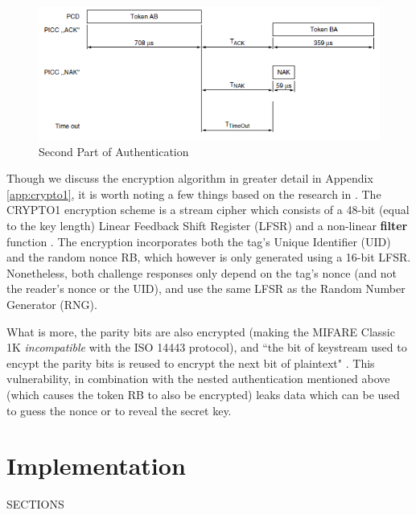 \documentclass[fleqn,10pt]{SelfArx} %
\begin{document}
\begin{figure}[h]
  \includegraphics[width=\linewidth]{img/auth2.png}
  \caption{Second Part of Authentication \cite{classic1k}}
  \label{fig:auth2}
\end{figure}

Though we discuss the encryption algorithm in greater detail in Appendix \ref{app:crypto1}, it is worth noting a few things based on the research in \cite{crypto1, classicvulnerabilities}. The CRYPTO1 encryption scheme is a stream cipher which consists of a 48-bit (equal to the key length) Linear Feedback Shift Register (LFSR) and a non-linear {\bf filter} function \cite{crypto1}. The encryption incorporates both the tag's Unique Identifier (UID) and the random nonce RB, which however is only generated using a 16-bit LFSR. Nonetheless, both challenge responses only depend on the tag's nonce (and not the reader's nonce or the UID), and use the same LFSR as the Random Number Generator (RNG). 

What is more, the parity bits are also encrypted (making the MIFARE Classic 1K {\em incompatible} with the ISO 14443 protocol), and ``the bit of keystream used to encypt the parity bits is reused to encrypt the next bit of plaintext" \cite{classicvulnerabilities}. This vulnerability, in combination with the nested authentication mentioned above (which causes the token RB to also be encrypted) leaks data which can be used to guess the nonce or to reveal the secret key.



\section{Implementation}
\label{sec:implementation}

SECTIONS
\end{document}
